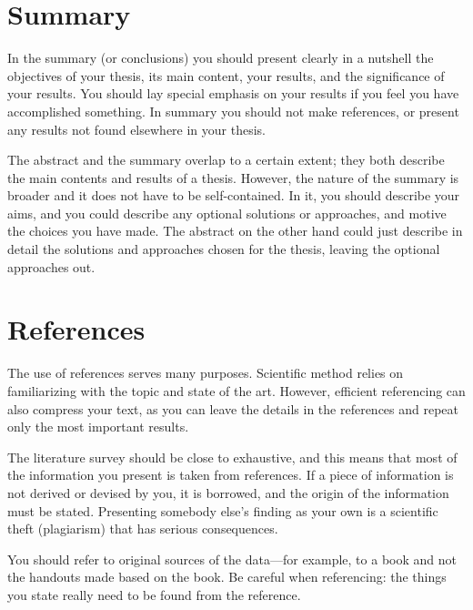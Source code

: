 \section{Summary}

In the summary (or conclusions) you should present clearly in a nutshell the objectives of your thesis, its main content, your results, and the significance of your results. You should lay special emphasis on your results if you feel you have accomplished something. In summary you should not make references, or present any results not found elsewhere in your thesis.

The abstract and the summary overlap to a certain extent; they both describe the main contents and results of a thesis. However, the nature of the summary is broader and it does not have to be self-contained. In it, you should describe your aims, and you could describe any optional solutions or approaches, and motive the choices you have made. The abstract on the other hand could just describe in detail the solutions and approaches chosen for the thesis, leaving the optional approaches out.

\section{References}

The use of references serves many purposes. Scientific method relies on familiarizing with the topic and state of the art. However, efficient referencing can also compress your text, as you can leave the details in the references and repeat only the most important results.

The literature survey should be close to exhaustive, and this means that most of the information you present is taken from references. If a piece of information is not derived or devised by you, it is borrowed, and the origin of the information must be stated. Presenting somebody else’s finding as your own is a scientific theft (plagiarism) that has serious consequences.

You should refer to original sources of the data---for example, to a book and not the handouts made based on the book. Be careful when referencing: the things you state really need to be found from the reference.

